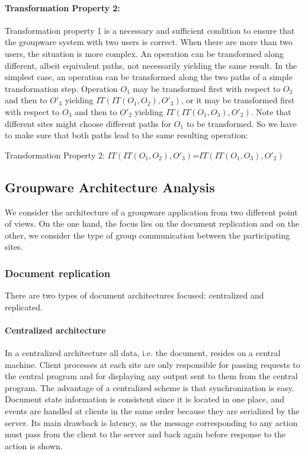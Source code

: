 \documentclass[11pt,a4paper]{article}
\begin{document}
\paragraph{Transformation Property 2:}
Transformation property 1 is a necessary and sufficient condition to ensure that the groupware system with two users is correct. When there are more than two users, the situation is more complex. An operation can be transformed along different, albeit equivalent paths, not necessarily yielding the same result. In the simplest case, an operation can be transformed along the two paths of a simple transformation step. Operation $O_{1}$ may be transformed first with respect to $O_{2}$ and then to $O'_{3}$ yielding $IT(IT(O_{1},O_{2}),O'_{3})$, or it may be transformed first with respect to $O_{3}$ and then to $O'_{2}$ yielding $IT(IT(O_{1},O_{3}),O'_{2})$. Note that different sites might choose different paths for $O_{1}$ to be transformed. So we have to make sure that both paths lead to the same resulting operation:

\begin{defn}
Transformation Property 2: 
$IT(IT(O_{1},O_{2}),O'_{3})$=$IT(IT(O_{1},O_{3}),O'_{2})$
\end{defn}


\subsection{Groupware Architecture Analysis} We consider the architecture of a groupware application from two different point of views. On the one hand, the focus lies on the document replication and on the other, we consider the type of group communication between the participating sites.

\subsubsection{Document replication}
There are two types of document architectures focused: centralized and replicated.

\paragraph{Centralized architecture} In a centralized architecture all data, i.e. the document, resides on a central machine. Client processes at each site are only responsible for passing requests to the central program and for displaying any output sent to them from the central program. The advantage of a centralized scheme is that synchronization is easy. Document state information is consistent since it is located in one place, and events are handled at clients in the same order because they are serialized by the server. Its main drawback is latency, as the message corresponding to any action must pass from the client to the server and back again before response to the action is shown.
\end{document}
